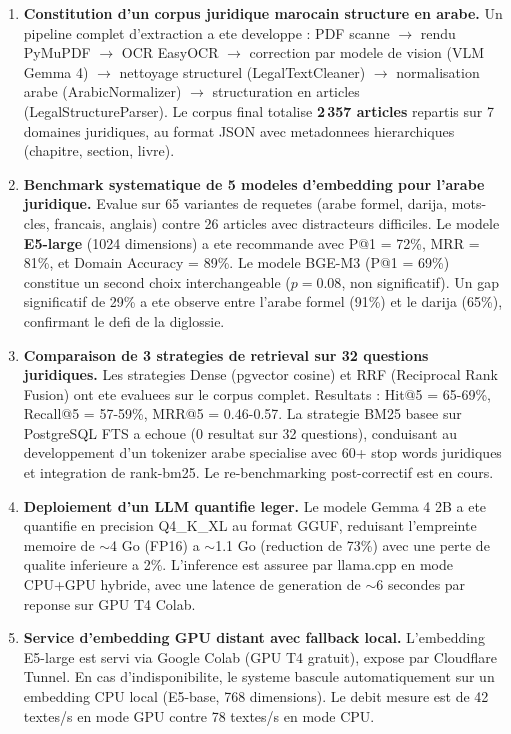 \begin{enumerate}
    \item \textbf{Constitution d'un corpus juridique marocain structure en arabe.} Un pipeline complet d'extraction a ete developpe : PDF scanne $\to$ rendu PyMuPDF $\to$ OCR EasyOCR $\to$ correction par modele de vision (VLM Gemma 4) $\to$ nettoyage structurel (LegalTextCleaner) $\to$ normalisation arabe (ArabicNormalizer) $\to$ structuration en articles (LegalStructureParser). Le corpus final totalise \textbf{2\,357 articles} repartis sur 7 domaines juridiques, au format JSON avec metadonnees hierarchiques (chapitre, section, livre).

    \item \textbf{Benchmark systematique de 5 modeles d'embedding pour l'arabe juridique.} Evalue sur 65 variantes de requetes (arabe formel, darija, mots-cles, francais, anglais) contre 26 articles avec distracteurs difficiles. Le modele \textbf{E5-large} (1024 dimensions) a ete recommande avec P@1 = 72\%, MRR = 81\%, et Domain Accuracy = 89\%. Le modele BGE-M3 (P@1 = 69\%) constitue un second choix interchangeable ($p = 0.08$, non significatif). Un gap significatif de 29\% a ete observe entre l'arabe formel (91\%) et le darija (65\%), confirmant le defi de la diglossie.

    \item \textbf{Comparaison de 3 strategies de retrieval sur 32 questions juridiques.} Les strategies Dense (pgvector cosine) et RRF (Reciprocal Rank Fusion) ont ete evaluees sur le corpus complet. Resultats : Hit@5 = 65-69\%, Recall@5 = 57-59\%, MRR@5 = 0.46-0.57. La strategie BM25 basee sur PostgreSQL FTS a echoue (0 resultat sur 32 questions), conduisant au developpement d'un tokenizer arabe specialise avec 60+ stop words juridiques et integration de rank-bm25. Le re-benchmarking post-correctif est en cours.

    \item \textbf{Deploiement d'un LLM quantifie leger.} Le modele Gemma 4 2B a ete quantifie en precision Q4\_K\_XL au format GGUF, reduisant l'empreinte memoire de $\sim$4 Go (FP16) a $\sim$1.1 Go (reduction de 73\%) avec une perte de qualite inferieure a 2\%. L'inference est assuree par llama.cpp en mode CPU+GPU hybride, avec une latence de generation de $\sim$6 secondes par reponse sur GPU T4 Colab.

    \item \textbf{Service d'embedding GPU distant avec fallback local.} L'embedding E5-large est servi via Google Colab (GPU T4 gratuit), expose par Cloudflare Tunnel. En cas d'indisponibilite, le systeme bascule automatiquement sur un embedding CPU local (E5-base, 768 dimensions). Le debit mesure est de 42 textes/s en mode GPU contre 78 textes/s en mode CPU.


\end{enumerate}
